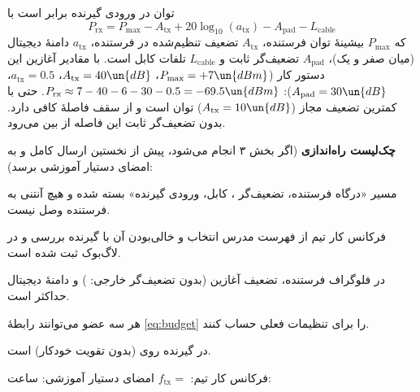 \documentclass[a4paper,11pt]{article}
\begin{document}
\begin{cautionbox}
توان در ورودی گیرنده برابر است با
\begin{equation}
	P_{\mathrm{rx}} = P_{\max} - A_{\mathrm{tx}} + 20\log_{10}(a_{\mathrm{tx}}) - A_{\mathrm{pad}} - L_{\mathrm{cable}}
	\label{eq:budget}
\end{equation}
که
$P_{\max}$
بیشینهٔ توان فرستنده،
$A_{\mathrm{tx}}$
تضعیف تنظیم‌شده در فرستنده،
$a_{\mathrm{tx}}$
دامنهٔ دیجیتال (میان صفر و یک)،
$A_{\mathrm{pad}}$
تضعیف‌گر ثابت و
$L_{\mathrm{cable}}$
تلفات کابل است. با مقادیر آغازین این دستور کار
($P_{\max} = +7\un{dBm}$، $A_{\mathrm{tx}} = 40\un{dB}$، $a_{\mathrm{tx}} = 0.5$، $A_{\mathrm{pad}} = 30\un{dB}$):
$P_{\mathrm{rx}} \approx 7 - 40 - 6 - 30 - 0.5 = -69.5\un{dBm}$.
حتی با کمترین تضعیف مجاز
($A_{\mathrm{tx}} = 10\un{dB}$)
توان
است و از سقف
فاصلهٔ کافی دارد. بدون تضعیف‌گر ثابت این فاصله از بین می‌رود.
\end{cautionbox}

\noindent
\textbf{چک‌لیست راه‌اندازی}
(اگر بخش ۳ انجام می‌شود، پیش از نخستین ارسال کامل و به امضای دستیار آموزشی برسد):
\begin{checklist}
\item مسیر «درگاه فرستنده، تضعیف‌گر
،
کابل، ورودی گیرنده» بسته شده و هیچ آنتنی به فرستنده وصل نیست.
\item فرکانس کار تیم از فهرست مدرس انتخاب و خالی‌بودن آن با گیرنده بررسی و در لاگ‌بوک ثبت شده است.
\item در فلوگراف فرستنده، تضعیف آغازین
 (بدون تضعیف‌گر خارجی: )
و دامنهٔ دیجیتال حداکثر
است.
\item هر سه عضو می‌توانند رابطهٔ
\eqref{eq:budget}
را برای تنظیمات فعلی حساب کنند.
\item در گیرنده  روی  (بدون تقویت خودکار) است.
\end{checklist}
\noindent
{\small فرکانس کار تیم: $f_{\mathrm{tx}} = $ \blank[2.6cm]  \hfill امضای دستیار آموزشی: \blank[3.4cm] \hfill ساعت: \blank[1.6cm]}
\end{document}
